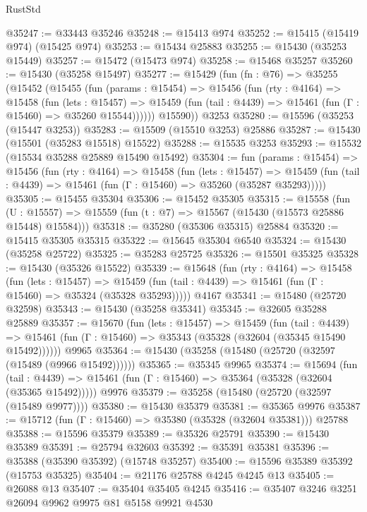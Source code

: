 \begin{lexlean}{RustStd}
\begin{coremodule}
@35247 := @33443 @35246
@35248 := @15413 @974
@35252 := @15415 (@15419 @974) (@15425 @974)
@35253 := @15434 @25883
@35255 := @15430 (@35253 @15449)
@35257 := @15472 (@15473 @974)
@35258 := @15468 @35257
@35260 := @15430 (@35258 @15497)
@35277 := @15429
    (fun (fn : @76) =>
    @35255
      (@15452
        (@15455
          (fun (params : @15454) =>
          @15456
            (fun (rty : @4164) =>
            @15458
              (fun (lets : @15457) =>
              @15459 (fun (tail : @4439) => @15461 (fun (Γ : @15460) => @35260 @15544))))))
        @15590))
    @3253
@35280 := @15596 (@35253 (@15447 @3253))
@35283 := @15509 (@15510 @3253) @25886
@35287 := @15430 (@15501 (@35283 @15518) @15522)
@35288 := @15535 @3253
@35293 := @15532 (@15534 @35288 @25889 @15490 @15492)
@35304 := fun (params : @15454) =>
  @15456
    (fun (rty : @4164) =>
    @15458
      (fun (lets : @15457) =>
      @15459 (fun (tail : @4439) => @15461 (fun (Γ : @15460) => @35260 (@35287 @35293)))))
@35305 := @15455 @35304
@35306 := @15452 @35305
@35315 := @15558
    (fun (U : @15557) => @15559 (fun (t : @7) => @15567 (@15430 (@15573 @25886 @15448) @15584)))
@35318 := @35280 (@35306 @35315) @25884
@35320 := @15415 @35305 @35315
@35322 := @15645 @35304 @6540
@35324 := @15430 (@35258 @25722)
@35325 := @35283 @25725
@35326 := @15501 @35325
@35328 := @15430 (@35326 @15522)
@35339 := @15648
    (fun (rty : @4164) =>
    @15458
      (fun (lets : @15457) =>
      @15459 (fun (tail : @4439) => @15461 (fun (Γ : @15460) => @35324 (@35328 @35293)))))
    @4167
@35341 := @15480 (@25720 @32598)
@35343 := @15430 (@35258 @35341)
@35345 := @32605 @35288 @25889
@35357 := @15670
    (fun (lets : @15457) =>
    @15459
      (fun (tail : @4439) =>
      @15461 (fun (Γ : @15460) => @35343 (@35328 (@32604 (@35345 @15490 @15492))))))
    @9965
@35364 := @15430 (@35258 (@15480 (@25720 (@32597 (@15489 (@9966 @15492))))))
@35365 := @35345 @9965
@35374 := @15694
    (fun (tail : @4439) => @15461 (fun (Γ : @15460) => @35364 (@35328 (@32604 (@35365 @15492)))))
    @9976
@35379 := @35258 (@15480 (@25720 (@32597 (@15489 @9977))))
@35380 := @15430 @35379
@35381 := @35365 @9976
@35387 := @15712 (fun (Γ : @15460) => @35380 (@35328 (@32604 @35381))) @25788
@35388 := @15596 @35379
@35389 := @35326 @25791
@35390 := @15430 @35389
@35391 := @25794 @32603
@35392 := @35391 @35381
@35396 := @35388 (@35390 @35392) (@15748 @35257)
@35400 := @15596 @35389 @35392 (@15753 @35325)
@35404 := @21176 @25788 @4245 @4245 @13
@35405 := @26088 @13
@35407 := @35404 @35405 @4245
@35416 := @35407 @3246 @3251 @26094 @9962 @9975 @81 @5158 @9921 @4530

\end{coremodule}
\end{lexlean}
